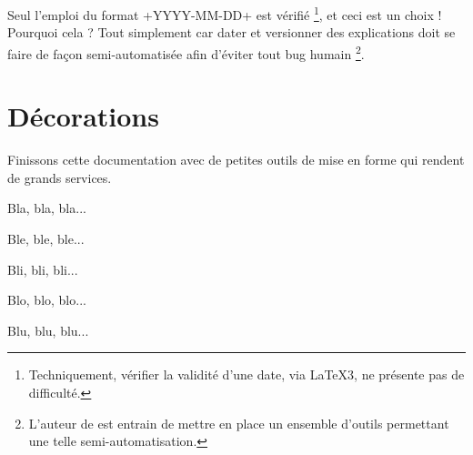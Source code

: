 \begin{bdocwarn}
    Seul l'emploi du format \bdocinlatex+YYYY-MM-DD+ est vérifié
    \footnote{
        Techniquement, vérifier la validité d'une date, via \LaTeX3, ne présente pas de difficulté.
    },
    et ceci est un choix ! Pourquoi cela ? Tout simplement car dater et versionner des explications doit se faire de façon semi-automatisée afin d'éviter tout bug humain
    \footnote{
        L'auteur de  est entrain de mettre en place un ensemble d'outils permettant une telle semi-automatisation.
    }.
\end{bdocwarn}


\section{Décorations}

Finissons cette documentation avec de petites outils de mise en forme qui rendent de grands services.

\begin{bdoclatex}[sbs]
Bla, bla, bla...

\bdocsep %

Ble, ble, ble...

Bli, bli, bli...

\bdocxspace %

Blo, blo, blo...

Blu, blu, blu...

\end{bdoclatex}


